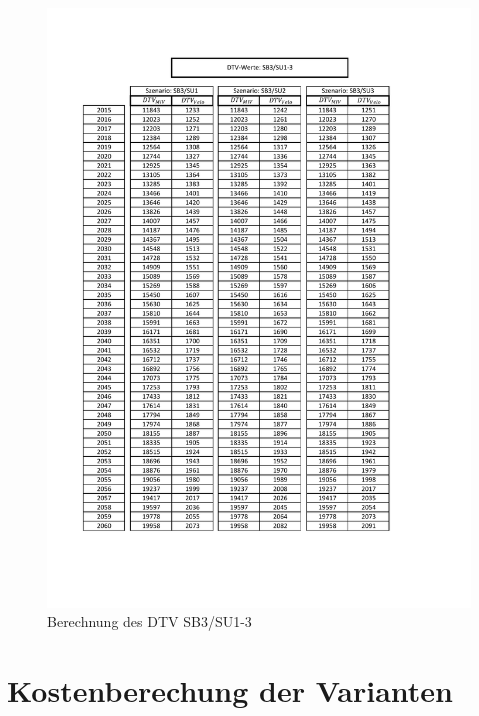 \begin{figure}[h!]
	\centering
	\includegraphics[width=\textwidth]{figures/Anhang/f-00-10-03-DTV-Modellierung}
	\caption{Berechnung des DTV SB3/SU1-3}
	\label{img:DTVModellierung}
\end{figure}


\section{Kostenberechung der Varianten}
\label{sec:Anhangkostenberechnug}



\printindex




